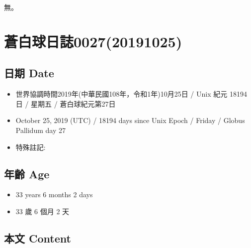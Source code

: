 \documentclass[a5paper, 12pt
]{book}
\providecommand{\tightlist}{%
  \setlength{\itemsep}{0pt}\setlength{\parskip}{0pt}}
\begin{document}
無。

\hypertarget{ux84bcux767dux7403ux65e5ux8a8c002720191025}{%
\section{蒼白球日誌0027(20191025)}\label{ux84bcux767dux7403ux65e5ux8a8c002720191025}}

\hypertarget{ux65e5ux671f-date-24}{%
\subsection{日期 Date}\label{ux65e5ux671f-date-24}}

\begin{itemize}
\tightlist
\item
  世界協調時間2019年(中華民國108年，令和1年)10月25日 / Unix 紀元 18194
  日 / 星期五 / 蒼白球紀元第27日
\item
  October 25, 2019 (UTC) / 18194 days since Unix Epoch / Friday / Globus
  Pallidum day 27
\item
  特殊註記:
\end{itemize}

\hypertarget{ux5e74ux9f61-age-24}{%
\subsection{年齡 Age}\label{ux5e74ux9f61-age-24}}

\begin{itemize}
\tightlist
\item
  33 years 6 months 2 days
\item
  33 歲 6 個月 2 天
\end{itemize}

\hypertarget{ux672cux6587-content-24}{%
\subsection{本文 Content}\label{ux672cux6587-content-24}}
\end{document}
